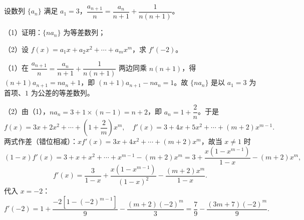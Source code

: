 \documentclass{exam-zh}
\begin{document}
\begin{problem}[points = 15]
设数列 $\{a_{n}\}$ 满足 $a_{1}=3$，$\dfrac{a_{n+1}}{n}=\dfrac{a_{n}}{n+1}+\dfrac{1}{n(n+1)}$。

（1）证明：$\{na_{n}\}$ 为等差数列；

（2）设 $f(x)=a_{1}x+a_{2}x^{2}+\cdots+a_{m}x^{m}$，求 $f'(-2)$。

\begin{solution}
（1）在 $\dfrac{a_{n+1}}{n}=\dfrac{a_{n}}{n+1}+\dfrac{1}{n(n+1)}$ 两边同乘 $n(n+1)$，得 $(n+1)a_{n+1}=na_{n}+1$，即 $(n+1)a_{n+1}-na_{n}=1$。故 $\{na_{n}\}$ 是以 $a_{1}=3$ 为首项、$1$ 为公差的等差数列。

（2）由（1），$na_{n}=3+1\times(n-1)=n+2$，即 $a_{n}=1+\dfrac{2}{n}$。于是
\[f(x)=3x+2x^{2}+\cdots+\left(1+\dfrac{2}{m}\right)x^{m},\quad f'(x)=3+4x+5x^{2}+\cdots+(m+2)x^{m-1}.\]
两式作差（错位相减）：$xf'(x)=3x+4x^{2}+\cdots+(m+2)x^{m}$，故当 $x\ne 1$ 时
\[(1-x)f'(x)=3+x+x^{2}+\cdots+x^{m-1}-(m+2)x^{m}=3+\frac{x(1-x^{m-1})}{1-x}-(m+2)x^{m},\]
\[f'(x)=\frac{3}{1-x}+\frac{x\left(1-x^{m-1}\right)}{(1-x)^{2}}-\frac{(m+2)x^{m}}{1-x}.\]
代入 $x=-2$：
\[f'(-2)=1+\frac{-2\left[1-(-2)^{m-1}\right]}{9}-\frac{(m+2)(-2)^{m}}{3}=\frac{7}{9}-\frac{(3m+7)(-2)^{m}}{9}.\]
\end{solution}
\end{problem}
\end{document}
